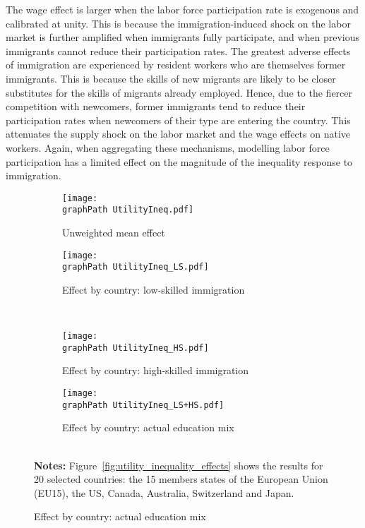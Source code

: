 \documentclass[a4paper,12pt]{article}
\def \graphPath {graphs/}
\begin{document}
The wage effect is larger when the labor force participation rate is exogenous and calibrated at unity. This is because the immigration-induced shock on the labor market is further amplified when immigrants fully participate, and when previous immigrants cannot reduce their participation rates. The greatest adverse effects of immigration are experienced by resident workers who are themselves former immigrants. This is because the skills of new migrants are likely to be closer substitutes for the skills of migrants already employed. Hence, due to the fiercer competition with newcomers, former immigrants tend to reduce their participation rates when newcomers of their type are entering the country. This attenuates the supply shock on the labor market and the wage effects on native workers. Again, when aggregating these mechanisms, modelling labor force participation has a limited effect on the magnitude of the inequality response to immigration.

\begin{landscape} 
\vspace*{\fill}
\begin{center}
\renewcommand{\arraystretch}{0.55}
\begin{figure}[h!]
\centering
\caption{Inequality effect of immigration (1\% of the total labor force) -- Sensitivity to labor market modelling}
\label{fig:utility_inequality_effects}
\begin{subfigure}{.45\linewidth}
  \centering
  \caption{Unweighted mean effect} \label{fig:utility_inequality_effects_a}
  \texttt{[image: \\graphPath UtilityIneq.pdf]}
\end{subfigure}
\hfill
\begin{subfigure}{.45\linewidth}
  \centering
    \caption{Effect by country: low-skilled immigration} \label{fig:utility_inequality_effects_b}
  \texttt{[image: \\graphPath UtilityIneq\_LS.pdf]}
\end{subfigure}
\\[0.5cm]
\begin{subfigure}{.45\linewidth}
  \centering
     \caption{Effect by country: high-skilled immigration} \label{fig:utility_inequality_effects_c}
  \texttt{[image: \\graphPath UtilityIneq\_HS.pdf]}
\end{subfigure}
\hfill
\begin{subfigure}{.45\linewidth}
  \centering
    \caption{Effect by country: actual education mix} \label{fig:utility_inequality_effects_d}
  \texttt{[image: \\graphPath UtilityIneq\_LS+HS.pdf]}
\end{subfigure}
\\[0.5cm]
{\footnotesize \textbf{Notes:} Figure~\ref{fig:utility_inequality_effects} shows the results for 20 selected countries: the 15 members states of the European Union (EU15), the US, Canada, Australia, Switzerland and Japan. }
\end{figure}
\end{center}
\vspace*{\fill}
\end{landscape}
\restoregeometry
\end{document}
